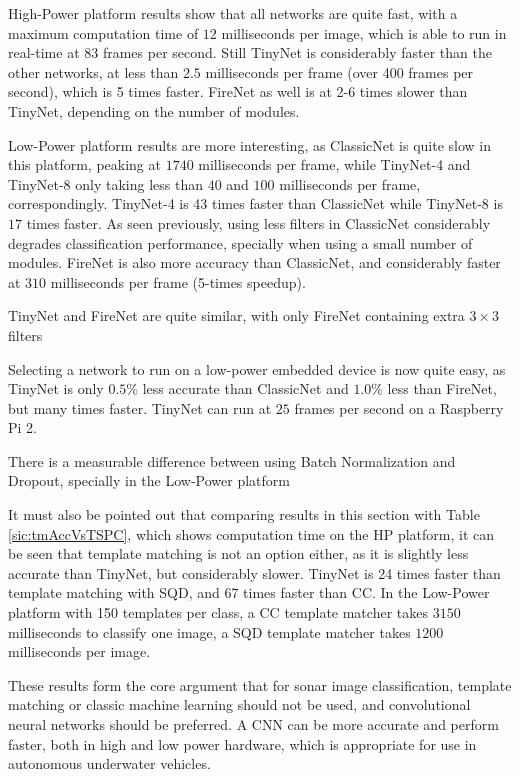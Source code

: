 High-Power platform results show that all networks are quite fast, with a maximum computation time of $12$ milliseconds per image, which is able to run in real-time at 83 frames per second. Still TinyNet is considerably faster than the other networks, at less than $2.5$ milliseconds per frame (over 400 frames per second), which is 5 times faster. FireNet as well is at 2-6 times slower than TinyNet, depending on the number of modules.

Low-Power platform results are more interesting, as ClassicNet is quite slow in this platform, peaking at $1740$ milliseconds per frame, while TinyNet-4 and TinyNet-8 only taking less than $40$ and $100$ milliseconds per frame, correspondingly. TinyNet-4 is 43 times faster than ClassicNet while TinyNet-8 is $17$ times faster. As seen previously, using less filters in ClassicNet considerably degrades classification performance, specially when using a small number of modules. FireNet is also more accuracy than ClassicNet, and considerably faster at $310$ milliseconds per frame (5-times speedup).

TinyNet and FireNet are quite similar, with only FireNet containing extra $3 \times 3$ filters

Selecting a network to run on a low-power embedded device is now quite easy, as TinyNet is only $0.5 \%$ less accurate than ClassicNet and $1.0 \%$ less than FireNet, but many times faster. TinyNet can run at $25$ frames per second on a Raspberry Pi 2.

There is a measurable difference between using Batch Normalization and Dropout, specially in the Low-Power platform

It must also be pointed out that comparing results in this section with Table \ref{sic:tmAccVsTSPC}, which shows computation time on the HP platform, it can be seen that template matching is not an option either, as it is slightly less accurate than TinyNet, but considerably slower. TinyNet is 24 times faster than template matching with SQD, and 67 times faster than CC. In the Low-Power platform with 150 templates per class, a CC template matcher takes $3150$ milliseconds to classify one image, a SQD template matcher takes $1200$ milliseconds per image.

These results form the core argument that for sonar image classification, template matching or classic machine learning should not be used, and convolutional neural networks should be preferred. A CNN can be more accurate and perform faster, both in high and low power hardware, which is appropriate for use in autonomous underwater vehicles.

